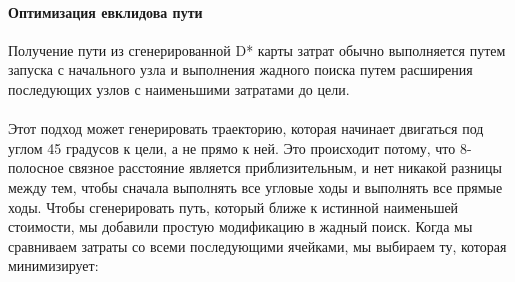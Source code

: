 \documentclass[12pt]{article}
\begin{document}
\paragraph{Оптимизация евклидова пути }
Получение пути из сгенерированной D* карты затрат обычно выполняется путем запуска с начального узла и выполнения жадного поиска путем расширения последующих узлов с наименьшими затратами до цели. \\
\\
Этот подход может генерировать траекторию, которая начинает двигаться под углом 45 градусов к цели, а не прямо к ней. Это происходит потому, что 8-полосное связное расстояние является приблизительным, и нет никакой разницы между тем, чтобы сначала выполнять все угловые ходы и выполнять все прямые ходы. Чтобы сгенерировать путь, который ближе к истинной наименьшей стоимости, мы добавили простую модификацию в жадный поиск. Когда мы сравниваем затраты со всеми последующими ячейками, мы выбираем ту, которая минимизирует:\\
\end{document}
